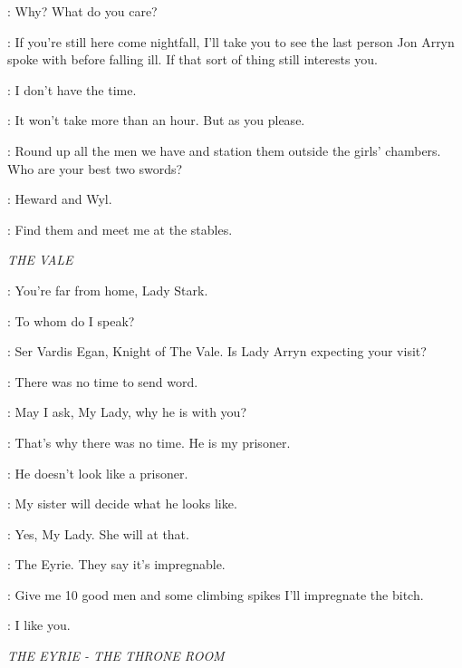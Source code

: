 \NED: Why? What do you care? 

\LITTLEFINGER: If you're still here come nightfall, I'll take you to see the last person Jon Arryn spoke with before falling ill. If that sort of thing still interests you. 

\NED: I don't have the time. 

\LITTLEFINGER: It won't take more than an hour. But as you please. 


\NED: Round up all the men we have and station them outside the girls' chambers. Who are your best two swords? 

\JORY: Heward and Wyl. 

\NED: Find them and meet me at the stables. 



\scene

\textit{THE VALE} 


\VARDIS: You're far from home, Lady Stark. 

\CATELYN: To whom do I speak? 

\VARDIS: Ser Vardis Egan, Knight of The Vale. Is Lady Arryn expecting your visit? 

\CATELYN: There was no time to send word. 

\VARDIS: May I ask, My Lady, why he is with you? 

\CATELYN: That's why there was no time. He is my prisoner. 

\VARDIS: He doesn't look like a prisoner. 

\CATELYN: My sister will decide what he looks like. 

\VARDIS: Yes, My Lady. She will at that. 


\TYRION: The Eyrie. They say it's impregnable. 

\BRONN: Give me 10 good men and some climbing spikes I'll impregnate the bitch. 

\TYRION: I like you. 

\scene

\textit{THE EYRIE - THE THRONE ROOM} 


